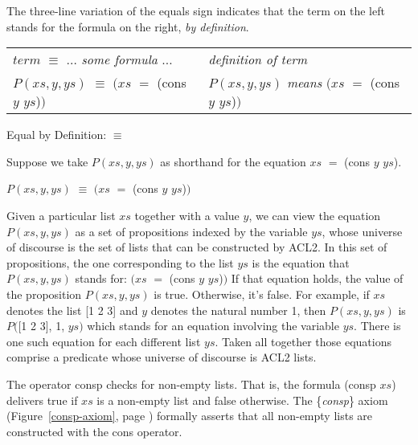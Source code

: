 \begin{aside}
The
three-line
variation of the equals sign
indicates that the term on the left stands
for the formula on the right, \emph{by definition}.
\begin{center}
\addtolength{\tabcolsep}{-2pt}
\begin{tabular}{ll}
$term$ $\equiv$ $\dots$ \emph{some formula} $\dots$    &\emph{definition of term} \\
$P(xs, y, ys)$ $\equiv$ $(xs$ $=$ \textsf{(cons $y$ $ys$)}$)$ &$P(xs, y, ys)$ \emph{means} $(xs$ $=$ \textsf{(cons $y$ $ys$)}$)$  \\
\end{tabular}
\addtolength{\tabcolsep}{2pt}
\end{center}
\caption{Equal by Definition: $\equiv$}
\label{three-line-equal}
\end{aside}

Suppose we take $P(xs, y, ys)$ as shorthand
for the equation $xs$ $=$ \textsf{(cons $y$ $ys$)}.
\begin{center}
$P(xs, y, ys)$ $\equiv$ $(xs$ $=$ \textsf{(cons $y$ $ys$)}$)$
\end{center}

Given a particular list $xs$ together with a value $y$,
we can view the equation $P(xs, y, ys)$ as a set of propositions
indexed by the variable $ys$, whose universe of discourse is the set of
lists that can be constructed by ACL2.
In this set of propositions, the one corresponding to
the list $ys$ is the equation that $P(xs, y, ys)$ stands for:
$(xs$ $=$ \textsf{(cons $y$ $ys$)}$)$
If that equation holds, the value of the proposition $P(xs, y, ys)$ is true.
Otherwise, it's false.
For example, if $xs$ denotes the list \textsf{[1 2 3]}
and $y$ denotes the natural number 1,
then $P(xs, y, ys)$ is $P($\textsf{[1 2 3]}, \textsf{1}, $ys)$
which stands for an equation involving the variable $ys$.
There is one such equation for each different list $ys$.
Taken all together those equations comprise a predicate
whose universe of discourse is ACL2 lists.

The operator 
\textsf{consp}
checks for non-empty lists.
That is, the formula \textsf{(consp $xs$)} delivers true
if $xs$ is a non-empty list and false otherwise.
The \{\emph{consp}\} axiom
(Figure~\ref{consp-axiom}, page \pageref{consp-axiom})
formally asserts that all non-empty lists
are constructed with the \textsf{cons} operator.

